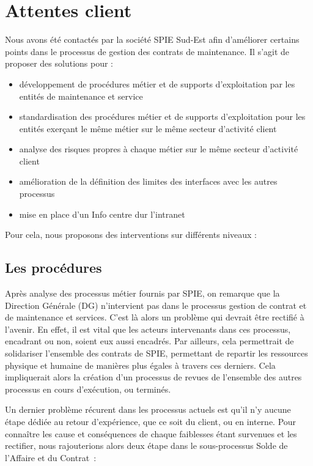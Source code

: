 \chapter{Attentes client}

	Nous avons été contactés par la société SPIE Sud-Est afin d'améliorer certains points dans le processus de gestion des contrats de maintenance. Il s'agit de proposer des solutions pour :

    \begin{itemize}
        \item développement de procédures métier et de supports d'exploitation par les entités de maintenance et service
        \item standardisation des procédures métier et de supports d'exploitation pour les entités exerçant le même métier sur le même secteur d'activité client
        \item analyse des risques propres à chaque métier sur le même secteur d'activité client
        \item amélioration de la définition des limites des interfaces avec les autres processus
        \item mise en place d'un Info centre dur l'intranet
    \end{itemize}

    Pour cela, nous proposons des interventions sur différents niveaux :


\section{Les procédures}

Après analyse des processus métier fournis par SPIE, on remarque que la Direction Générale (DG) n'intervient
pas dans le processus gestion de contrat et de maintenance et services.
C'est là alors un problème qui devrait être rectifié à l'avenir. En effet, il est vital que les acteurs intervenants dans ces processus, encadrant ou non, soient eux aussi encadrés.
Par ailleurs, cela permettrait de solidariser l'ensemble des contrats de SPIE, permettant de repartir les ressources physique et humaine de manières plus égales à travers ces derniers.
Cela impliquerait alors la création d'un processus de revues de l'ensemble des autres processus en cours d’exécution, ou terminés.

Un dernier problème récurent dans les processus actuels est qu'il n'y aucune étape dédiée au retour d'expérience, que ce soit du client, ou en interne. Pour connaître les cause et conséquences de chaque faiblesses étant survenues et les rectifier, nous rajouterions alors deux étape dans le sous-processus Solde de l'Affaire et du Contrat~:

